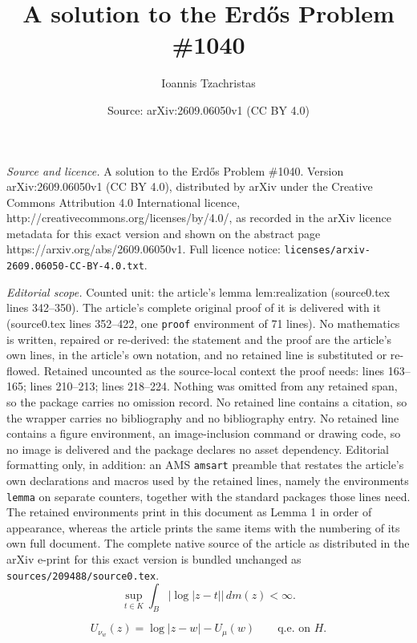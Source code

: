 \documentclass[10pt,a4paper]{amsart}
\title{A solution to the Erd\H{o}s Problem \#1040}
\author{Ioannis Tzachristas}
\date{Source: arXiv:2609.06050v1 (CC BY 4.0)}
\newcommand{\qe}{\text{q.e.}}
\begin{document}
\maketitle

\noindent\emph{Source and licence.} A solution to the Erd\H{o}s Problem \#1040. Version arXiv:2609.06050v1 (CC BY 4.0), distributed by arXiv under the Creative Commons Attribution 4.0 International licence, http://creativecommons.org/licenses/by/4.0/, as recorded in the arXiv licence metadata for this exact version and shown on the abstract page https://arxiv.org/abs/2609.06050v1. Full licence notice: \texttt{licenses/arxiv-2609.06050-CC-BY-4.0.txt}.\par\smallskip

\noindent\textit{Editorial scope.} Counted unit: the article's lemma lem:realization (source0.tex lines 342--350). The article's complete original proof of it is delivered with it (source0.tex lines 352--422, one \texttt{proof} environment of 71 lines). No mathematics is written, repaired or re-derived: the statement and the proof are the article's own lines, in the article's own notation, and no retained line is substituted or re-flowed.  Retained uncounted as the source-local context the proof needs: lines 163--165; lines 210--213; lines 218--224.  Nothing was omitted from any retained span, so the package carries no omission record.  No retained line contains a citation, so the wrapper carries no bibliography and no bibliography entry.  No retained line contains a figure environment, an image-inclusion command or drawing code, so no image is delivered and the package declares no asset dependency.  Editorial formatting only, in addition: an AMS \texttt{amsart} preamble that restates the article's own declarations and macros used by the retained lines, namely the environments \texttt{lemma} on separate counters, together with the standard packages those lines need.  The retained environments print in this document as Lemma 1 in order of appearance, whereas the article prints the same items with the numbering of its own full document.  The complete native source of the article as distributed in the arXiv e-print for this exact version is bundled unchanged as \texttt{sources/209488/source0.tex}.
\begin{equation}\label{eq:log-int}
 \sup_{t\in K}\int_B |\log|z-t||\,dm(z)<\infty.
\end{equation}

\begin{equation}\label{eq:balayage-one}
 U_{\nu_w}(z)=\log|z-w|-U_\mu(w)
 \qquad\qe\text{ on }H.
\end{equation}
\end{document}
